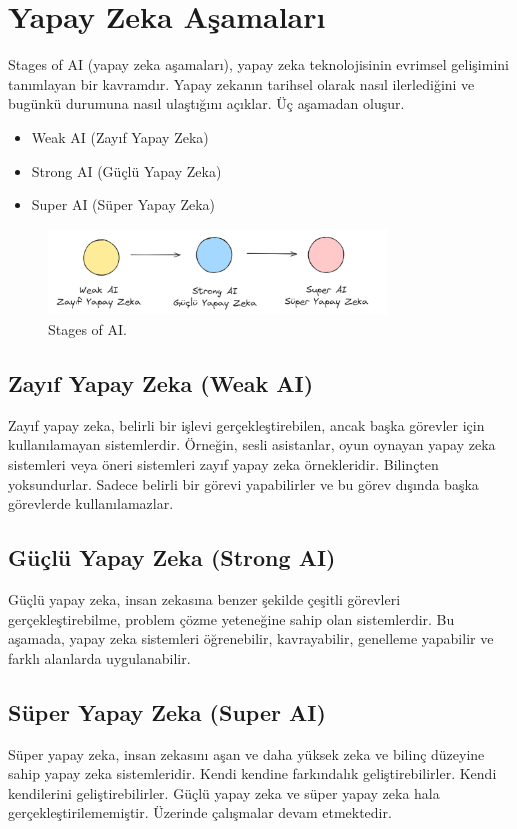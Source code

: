 \section{Yapay Zeka Aşamaları}
Stages of AI (yapay zeka aşamaları), yapay zeka teknolojisinin evrimsel gelişimini tanımlayan bir kavramdır. Yapay zekanın tarihsel olarak nasıl ilerlediğini ve bugünkü durumuna nasıl ulaştığını açıklar. Üç aşamadan oluşur.
\begin{itemize}
    \item Weak AI (Zayıf Yapay Zeka)
    \item Strong AI (Güçlü Yapay Zeka)
    \item Super AI (Süper Yapay Zeka)
\end{itemize}

\begin{figure}[h]
  \centering
  \includegraphics[width=0.8\textwidth]{images/stages_of_ai.png}
  \caption{Stages of AI.}
\end{figure}

\subsection{Zayıf Yapay Zeka (Weak AI)}
Zayıf yapay zeka, belirli bir işlevi gerçekleştirebilen, ancak başka görevler için kullanılamayan sistemlerdir. Örneğin, sesli asistanlar, oyun oynayan yapay zeka sistemleri veya öneri sistemleri zayıf yapay zeka örnekleridir. Bilinçten yoksundurlar. Sadece belirli bir görevi yapabilirler ve bu görev dışında başka görevlerde kullanılamazlar.

\subsection{Güçlü Yapay Zeka (Strong AI)}
Güçlü yapay zeka, insan zekasına benzer şekilde çeşitli görevleri gerçekleştirebilme, problem çözme yeteneğine sahip olan sistemlerdir. Bu aşamada, yapay zeka sistemleri öğrenebilir, kavrayabilir, genelleme yapabilir ve farklı alanlarda uygulanabilir. 

\subsection{Süper Yapay Zeka (Super AI)}
Süper yapay zeka, insan zekasını aşan ve daha yüksek zeka ve bilinç düzeyine sahip yapay zeka sistemleridir. Kendi kendine farkındalık geliştirebilirler. Kendi kendilerini geliştirebilirler. Güçlü yapay zeka ve süper yapay zeka hala gerçekleştirilememiştir. Üzerinde çalışmalar devam etmektedir.

\newpage